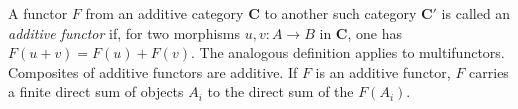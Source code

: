 A functor $F$ from an additive category $\mathbf{C}$ to another such category $\mathbf{C}'$ is
called an \textit{additive functor} if, for two morphisms
$u,v:A\to B$ in $\mathbf{C}$, one has
$F(u+v)=F(u)+F(v)$. The analogous definition applies to multifunctors.
Composites of additive functors are additive. If $F$ is an additive functor,
$F$ carries a finite direct sum of objects $A_i$ to the direct sum of the
$F(A_i)$.


